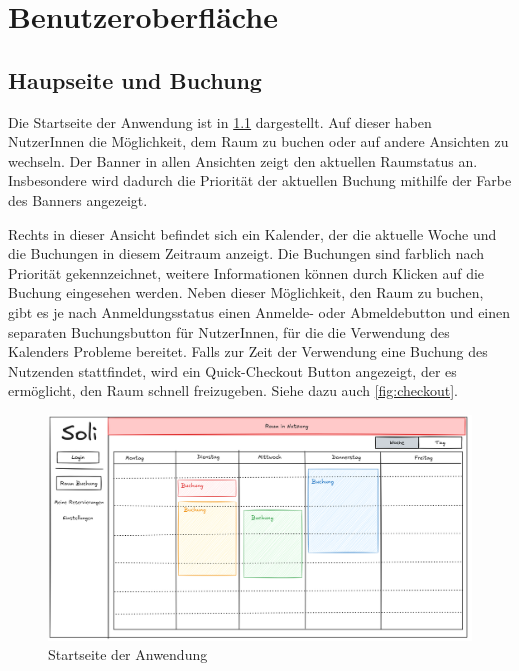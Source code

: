 
\chapter{Benutzeroberfläche}
\label{chap:ui}

\section{Haupseite und Buchung}

Die Startseite der Anwendung ist in \ref{fig:startseite} dargestellt.
Auf dieser haben NutzerInnen die Möglichkeit, dem Raum zu buchen oder auf andere Ansichten zu wechseln.
Der Banner in allen Ansichten zeigt den aktuellen Raumstatus an.
Insbesondere wird dadurch die Priorität der aktuellen Buchung mithilfe der Farbe des Banners angezeigt.

Rechts in dieser Ansicht befindet sich ein Kalender, der die aktuelle Woche und die Buchungen in diesem Zeitraum anzeigt.
Die Buchungen sind farblich nach Priorität gekennzeichnet, weitere Informationen können durch Klicken auf die Buchung eingesehen werden.
Neben dieser Möglichkeit, den Raum zu buchen, gibt es je nach Anmeldungsstatus einen Anmelde- oder Abmeldebutton und einen separaten Buchungsbutton für NutzerInnen,
für die die Verwendung des Kalenders Probleme bereitet.
Falls zur Zeit der Verwendung eine Buchung des Nutzenden stattfindet, wird ein Quick-Checkout Button angezeigt,
der es ermöglicht, den Raum schnell freizugeben.
Siehe dazu auch \ref{fig:checkout}.
\begin{figure}[ht]
    \centering
    \includegraphics[scale=0.15]{figures/ui/startseite}
    \caption{Startseite der Anwendung}
    \label{fig:startseite}
\end{figure}
\clearpage

